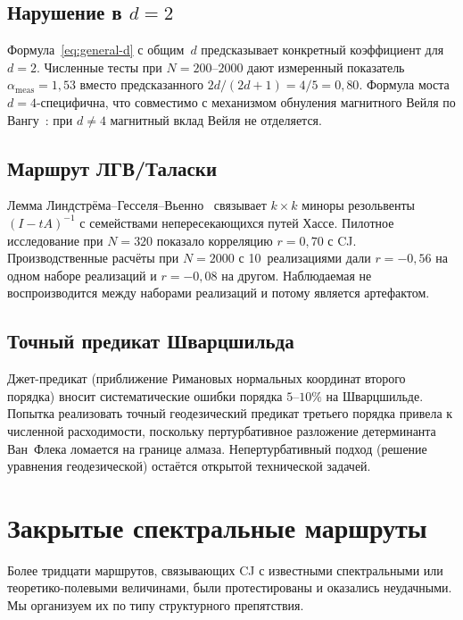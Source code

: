 \documentclass[12pt,a4paper]{article}
\theoremstyle{plain}
\theoremstyle{definition}
\theoremstyle{remark}
\begin{document}
\subsection{Нарушение в $d = 2$}
\label{sec:d2fail}

Формула~\eqref{eq:general-d} с общим~$d$ предсказывает
конкретный коэффициент для $d = 2$.  Численные тесты при
$N = 200$--$2000$ дают измеренный показатель
$\alpha_{\mathrm{meas}} = 1{,}53$ вместо предсказанного
$2d/(2d+1) = 4/5 = 0{,}80$.  Формула моста
$d = 4$-специфична, что совместимо с механизмом обнуления
магнитного Вейля по Вангу~\cite{Wang:2019}: при $d \neq 4$
магнитный вклад Вейля не отделяется.

\subsection{Маршрут ЛГВ/Таласки}
\label{sec:lgv}

Лемма
Линдстрёма--Гесселя--Вьенно~\cite{GesselViennot:1985}
связывает $k \times k$ миноры резольвенты $(I - tA)^{-1}$
с семействами непересекающихся путей Хассе.  Пилотное
исследование при $N = 320$ показало корреляцию
$r = 0{,}70$ с CJ.  Производственные расчёты при $N = 2000$
с 10~реализациями дали $r = -0{,}56$ на одном наборе
реализаций и $r = -0{,}08$ на другом.  Наблюдаемая не
воспроизводится между наборами реализаций и потому является
артефактом.

\subsection{Точный предикат Шварцшильда}
\label{sec:exact-sch}

Джет-предикат (приближение Римановых нормальных координат
второго порядка) вносит систематические ошибки порядка
$5$--$10\%$ на Шварцшильде.  Попытка реализовать точный
геодезический предикат третьего порядка привела к численной
расходимости, поскольку пертурбативное разложение
детерминанта Ван~Флека ломается на границе алмаза.
Непертурбативный подход (решение уравнения геодезической)
остаётся открытой технической задачей.

\section{Закрытые спектральные маршруты}
\label{sec:closed}

Более тридцати маршрутов, связывающих CJ с известными
спектральными или теоретико-полевыми величинами, были
протестированы и оказались неудачными.  Мы организуем их
по типу структурного препятствия.
\end{document}
